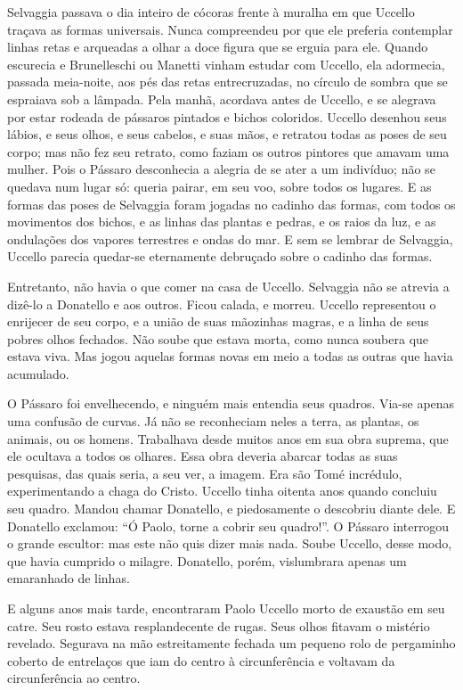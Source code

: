Selvaggia passava o dia inteiro de cócoras frente à muralha em que Uccello
traçava as formas universais. Nunca compreendeu por que ele preferia
contemplar linhas retas e arqueadas a olhar a doce figura que se erguia
para ele. Quando escurecia e Brunelleschi ou Manetti vinham estudar com
Uccello, ela adormecia, passada meia-noite, aos pés das retas
entrecruzadas, no círculo de sombra que se espraiava sob a lâmpada. Pela
manhã, acordava antes de Uccello, e se alegrava por estar rodeada de
pássaros pintados e bichos coloridos. Uccello desenhou seus lábios, e seus
olhos, e seus cabelos, e suas mãos, e retratou todas as poses de seu
corpo; mas não fez seu retrato, como faziam os outros pintores que amavam
uma mulher. Pois o Pássaro desconhecia a alegria de se ater a um
indivíduo; não se quedava num lugar só: queria pairar, em seu voo, sobre
todos os lugares. E as formas das poses de Selvaggia foram jogadas no
cadinho das formas, com todos os movimentos dos bichos, e as linhas das
plantas e pedras, e os raios da luz, e as ondulações dos vapores
terrestres e ondas do mar. E sem se lembrar de Selvaggia, Uccello parecia
quedar-se eternamente debruçado sobre o cadinho das formas.

Entretanto, não havia o que comer na casa de Uccello. Selvaggia não se
atrevia a dizê-lo a Donatello e aos outros. Ficou calada, e morreu.
Uccello representou o enrijecer de seu corpo, e a união de suas mãozinhas
magras, e a linha de seus pobres olhos fechados. Não soube que estava
morta, como nunca soubera que estava viva. Mas jogou aquelas formas novas
em meio a todas as outras que havia acumulado.

O Pássaro foi envelhecendo, e ninguém mais entendia seus quadros. Via-se
apenas uma confusão de curvas. Já não se reconheciam neles a terra, as
plantas, os animais, ou os homens. Trabalhava desde muitos anos em sua
obra suprema, que ele ocultava a todos os olhares. Essa obra deveria
abarcar todas as suas pesquisas, das quais seria, a seu ver, a imagem. Era
são Tomé incrédulo, experimentando a chaga do Cristo. Uccello tinha
oitenta anos quando concluiu seu quadro. Mandou chamar Donatello, e
piedosamente o descobriu diante dele. E Donatello exclamou: “Ó Paolo,
torne a cobrir seu quadro!”. O Pássaro interrogou o grande escultor: mas
este não quis dizer mais nada. Soube Uccello, desse modo, que havia
cumprido o milagre. Donatello, porém, vislumbrara apenas um emaranhado de
linhas.

E alguns anos mais tarde, encontraram Paolo \mbox{Uccello} morto de exaustão em
seu catre. Seu rosto estava resplandecente de rugas. Seus olhos fitavam o
mistério revelado. Segurava na mão estreitamente fechada um pequeno rolo
de pergaminho coberto de entrelaços que iam do centro à circunferência e
voltavam da circunferência ao centro.

